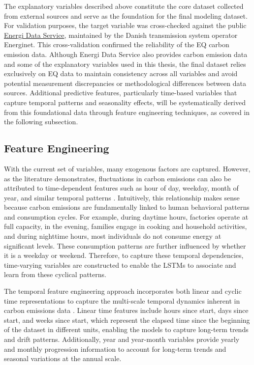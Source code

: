 The explanatory variables described above constitute the core dataset collected from external sources and serve as the foundation for the final modeling dataset. For validation purposes, the target variable was cross-checked against the public \href{https://www.energidataservice.dk/}{Energi Data Service}, maintained by the Danish transmission system operator Energinet. This cross-validation confirmed the reliability of the EQ carbon emission data. Although Energi Data Service also provides carbon emission data and some of the explanatory variables used in this thesis, the final dataset relies exclusively on EQ data to maintain consistency across all variables and avoid potential measurement discrepancies or methodological differences between data sources. Additional predictive features, particularly time-based variables that capture temporal patterns and seasonality effects, will be systematically derived from this foundational data through feature engineering techniques, as covered in the following subsection.

\subsection{Feature Engineering}

With the current set of variables, many exogenous factors are captured. However, as the literature demonstrates, fluctuations in carbon emissions can also be attributed to time-dependent features such as hour of day, weekday, month of year, and similar temporal patterns \parencite{wang2017}. Intuitively, this relationship makes sense because carbon emissions are fundamentally linked to human behavioral patterns and consumption cycles. For example, during daytime hours, factories operate at full capacity, in the evening, families engage in cooking and household activities, and during nighttime hours, most individuals do not consume energy at significant levels. These consumption patterns are further influenced by whether it is a weekday or weekend. Therefore, to capture these temporal dependencies, time-varying variables are constructed to enable the LSTMs to associate and learn from these cyclical patterns.

The temporal feature engineering approach incorporates both linear and cyclic time representations to capture the multi-scale temporal dynamics inherent in carbon emissions data \parencite{hyndman2021}. Linear time features include hours since start, days since start, and weeks since start, which represent the elapsed time since the beginning of the dataset in different units, enabling the models to capture long-term trends and drift patterns. Additionally, year and year-month variables provide yearly and monthly progression information to account for long-term trends and seasonal variations at the annual scale.

